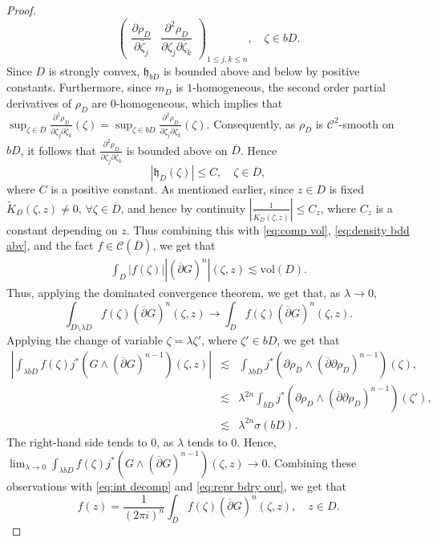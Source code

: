 \documentclass[11pt, oneside, reqno]{amsart}
\numberwithin{equation}{section}
\theoremstyle{definition}
\newcommand{\beas}{\begin{eqnarray*}}
\newcommand{\eeas}{\end{eqnarray*}}
\newcommand{\be} {\begin{equation}}
\newcommand{\ee} {\end{equation}}
\newcommand{\cont}{\mathcal C}
\newcommand{\ltt}{\left(}
\newcommand{\rtt}{\right)}
\begin{document}
{\begin{proof}
\[\begin{pmatrix}
    \dfrac{\partial\rho_D}{\partial \bar \zeta_j} & 
    \dfrac{\partial^2\rho_D}{\partial \zeta_j\partial \bar \zeta_k}
\end{pmatrix}_{1\leq j,k\leq n}, \quad \zeta\in bD.
\]
Since $D$ is strongly convex, $\mathfrak{h}_{b D}$ is bounded above and below by positive constants.
Furthermore, since $m_D$ is $1$-homogeneous, the second order partial derivatives of $\rho_D$ are $0$-homogeneous, which implies that $\sup_{\zeta\in\overline D} \frac{\partial^2\rho_D}{\partial \zeta_j\partial \bar \zeta_k}(\zeta)=\sup_{\zeta\in b D}\frac{\partial^2\rho_D}{\partial \zeta_j\partial \bar \zeta_k}(\zeta)$. Consequently, as $\rho_D$ is $\cont^2$-smooth on $bD$, it follows that $\frac{\partial^2\rho_D}{\partial \zeta_j\partial \bar \zeta_k}$ is bounded above on $\overline  D$. Hence 
\be\label{eq:density bdd abv}
\left|\mathfrak h_ D(\zeta)\right|\leq C,\quad \zeta\in\overline  D,
\ee
where $C$ is a positive constant.
As mentioned earlier, since $z\in D$ is fixed $\widetilde K_ D\ltt\zeta,z\rtt\neq 0,\, \forall\zeta\in\overline D$, and hence by continuity $\left|\frac{1}{\widetilde K_ D\ltt\zeta,z\rtt}\right|\leq C_z$, where $C_z$ is a constant depending on $z$. Thus combining this with \eqref{eq:comp vol}, \eqref{eq:density bdd abv}, and the fact $f\in \cont\ltt\overline D\rtt$, we get that
\beas
\int_{ D}\left|f(\zeta)\right| \left|\ltt \overline \partial G\rtt^n\right|\ltt\zeta,z\rtt\lesssim \text{vol}(D).
\eeas
Thus, applying the dominated convergence theorem, we get that, as $\lambda\rightarrow 0$, 
\[
\int_{ D\setminus \overline{\lambda D}}f(\zeta) \ltt \overline \partial G\rtt^n\ltt\zeta,z\rtt\rightarrow \int_{ D}f(\zeta) \ltt \overline \partial G\rtt^n\ltt\zeta,z\rtt.
\]
Applying the change of variable $\zeta=\lambda\zeta'$, where $\zeta'\in b D$, we get that
\beas
\left|\int_{\lambda b D}  f(\zeta)j^*\ltt G\wedge\ltt\overline\partial G\rtt^{n-1}\rtt(\zeta,z)\right|&\lesssim&\int _{\lambda b D}j^*\ltt\partial \rho_D\wedge\ltt\overline\partial\partial\rho_D\rtt^{n-1}\rtt(\zeta),\\
&\lesssim& \lambda^{2n}\int_{b D} j^*\ltt\partial \rho_D\wedge\ltt\overline\partial\partial\rho_D\rtt^{n-1}\rtt(\zeta'),\\
&\lesssim& \lambda^{2n} \sigma\ltt b D\rtt.
\eeas
The right-hand side tends to $0$, as $\lambda$ tends to $0$. Hence, $\lim_{\lambda\rightarrow 0}\int_{\lambda b D}  f(\zeta)j^*\ltt G\wedge\ltt\overline\partial G\rtt^{n-1}\rtt(\zeta,z)\rightarrow 0$. Combining these observations with \eqref{eq:int decomp} and \eqref{eq:repr bdry our}, we get that
 \[
 f(z)=\frac{1}{(2\pi i)^n}\int_ D f(\zeta)\ltt\overline{\partial}G\rtt^n\ltt\zeta,z\rtt,\quad z\in D.
 \]


\end{proof}}
\end{document}
